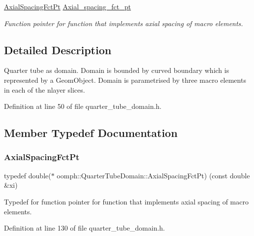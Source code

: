 \begin{DoxyCompactItemize}
\hyperlink{classoomph_1_1QuarterTubeDomain_ae347af42a5dcb9b3b82c2247975b01db}{Axial\+Spacing\+Fct\+Pt} \hyperlink{classoomph_1_1QuarterTubeDomain_ad084b0e50d50b1948c2e9a600e3dcbd0}{Axial\+\_\+spacing\+\_\+fct\+\_\+pt}
\begin{DoxyCompactList}\small\item\em Function pointer for function that implements axial spacing of macro elements. \end{DoxyCompactList}\end{DoxyCompactItemize}


\subsection{Detailed Description}
Quarter tube as domain. Domain is bounded by curved boundary which is represented by a Geom\+Object. Domain is parametrised by three macro elements in each of the nlayer slices. 

Definition at line 50 of file quarter\+\_\+tube\+\_\+domain.\+h.



\subsection{Member Typedef Documentation}
\mbox{\label{classoomph_1_1QuarterTubeDomain_ae347af42a5dcb9b3b82c2247975b01db}} 
\subsubsection{\texorpdfstring{Axial\+Spacing\+Fct\+Pt}{AxialSpacingFctPt}}
{\footnotesize\ttfamily typedef double($\ast$ oomph\+::\+Quarter\+Tube\+Domain\+::\+Axial\+Spacing\+Fct\+Pt) (const double \&xi)}



Typedef for function pointer for function that implements axial spacing of macro elements. 



Definition at line 130 of file quarter\+\_\+tube\+\_\+domain.\+h.

\mbox{\label{classoomph_1_1QuarterTubeDomain_a3d8c15c17d9912d8c519c028437c0b2c}} 
